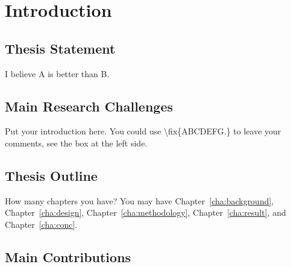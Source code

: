 \chapter{Introduction}
\label{cha:intro}


\section{Thesis Statement}
\label{sec:thesisstatement}
I believe A is better than B.


\section{Main Research Challenges}
\label{sec:problemstatement}
Put your introduction here. You could use \textbackslash fix\{ABCDEFG.\} to
leave your comments, see the box at the left side.  


\section{Thesis Outline}
\label{sec:outline}
How many chapters you have? You may have Chapter~\ref{cha:background},
Chapter~\ref{cha:design}, Chapter~\ref{cha:methodology},
Chapter~\ref{cha:result}, and Chapter~\ref{cha:conc}.

\section{Main Contributions}
